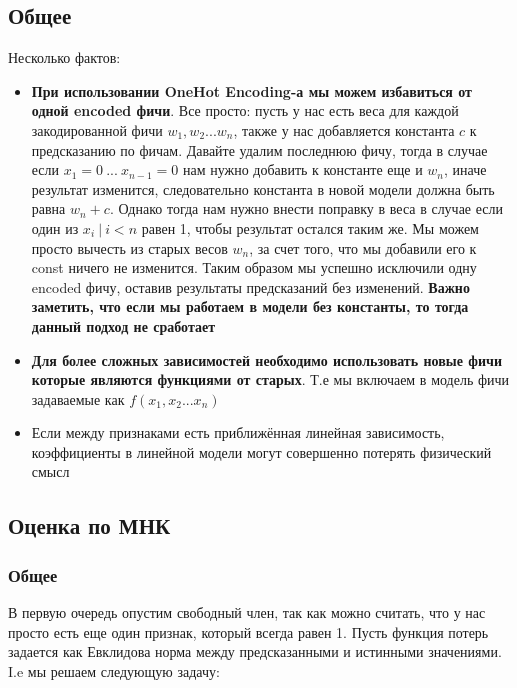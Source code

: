 \documentclass{article}
\begin{document}
    \subsection{Общее}

    Несколько фактов:

    \begin{itemize}
        \item \textbf{При использовании OneHot Encoding-а мы можем избавиться от одной encoded фичи}.
        Все просто: пусть у нас есть веса для каждой закодированной фичи $w_{1}, w_{2} ... w_{n}$, также у нас добавляется константа $c$
        к предсказанию по фичам.
        Давайте удалим последнюю фичу, тогда в случае если $x_{1} = 0 \ ... \ x_{n-1} = 0$ нам нужно добавить к константе еще и $w_{n}$, иначе результат изменится, следовательно
        константа в новой модели должна быть равна $w_{n} + c$. 
        Однако тогда нам нужно внести поправку в веса в случае если один из $x_{i} \ | \ i < n$ равен 1, чтобы
        результат остался таким же. 
        Мы можем просто вычесть из старых весов $w_{n}$, за счет того, что мы добавили его к const ничего не изменится.
        Таким образом мы успешно исключили одну encoded фичу, оставив результаты предсказаний без изменений. 
        \textbf{Важно заметить, что если мы работаем в модели без константы, то тогда данный подход не сработает}
        \item \textbf{Для более сложных зависимостей необходимо использовать новые фичи которые являются функциями от старых}.
        Т.е мы включаем в модель фичи задаваемые как $f(x_{1}, x_{2} ... x_{n})$
        \item Если между признаками есть приближённая линейная зависимость, коэффициенты в линейной модели могут совершенно потерять физический смысл
  
    \end{itemize}
    
    \subsection{Оценка по МНК}

    \subsubsection{Общее}

    В первую очередь опустим свободный член, так как можно считать, что у нас просто есть еще один признак, который всегда равен 1.
    Пусть функция потерь задается как Евклидова норма между предсказанными и истинными значениями.
    I.e мы решаем следующую задачу:
\end{document}
